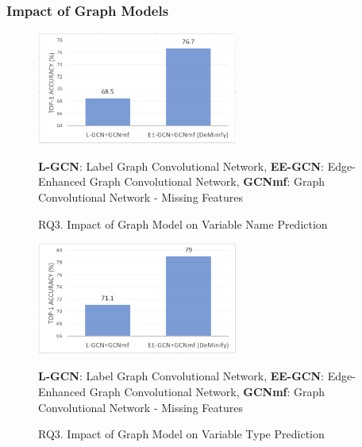 \subsubsection{Impact of Graph Models}
\label{sec:models}

\begin{figure}[thbp]
\begin{center}
\includegraphics[width=2.6in]{figures/sensi-models-name}
\vspace{-8pt}
\caption{RQ3. Impact of Graph Model on Variable Name Prediction}
\label{models-name-result}
{\bf L-GCN}: Label Graph Convolutional Network, {\bf EE-GCN}: Edge-Enhanced Graph Convolutional Network, {\bf GCNmf}: Graph Convolutional Network - Missing Features
\end{center}
\end{figure}

\begin{figure}[thbp]
\begin{center}
\includegraphics[width=2.6in]{figures/sensi-models-type}
\vspace{-8pt}
\caption{RQ3. Impact of Graph Model on Variable Type Prediction}
\label{models-type-result}
{\bf L-GCN}: Label Graph Convolutional Network, {\bf EE-GCN}: Edge-Enhanced Graph Convolutional Network, {\bf GCNmf}: Graph Convolutional Network - Missing Features
\end{center}
\end{figure}
